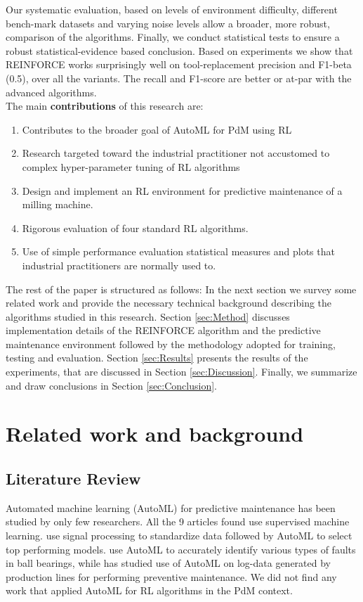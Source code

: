 \documentclass[a4paper, 12pt]{article}
\begin{document}
Our systematic evaluation, based on levels of environment difficulty, different bench-mark datasets and varying noise levels allow a broader, more robust, comparison of the algorithms. Finally, we conduct statistical tests to ensure a robust statistical-evidence based conclusion. Based on experiments we show that REINFORCE works surprisingly well on tool-replacement precision and F1-beta (0.5), over all the variants. The recall and F1-score are better or at-par with the advanced algorithms.\\

The main \textbf{contributions} of this research are:
\begin{enumerate}
	\item Contributes to the broader goal of AutoML for PdM using RL
	\item Research targeted toward the industrial practitioner not accustomed to complex hyper-parameter tuning of RL algorithms
	\item Design and implement an RL environment for predictive maintenance of a milling machine.
	\item Rigorous evaluation of four standard RL algorithms.
	\item Use of simple performance evaluation statistical measures and plots that industrial practitioners are normally used to.
\end{enumerate} 

The rest of the paper is structured as follows: In the next section we survey some related work and provide the necessary technical background describing the algorithms studied in this research. Section \ref{sec:Method} discusses implementation details of the REINFORCE algorithm and the predictive maintenance environment followed by the methodology adopted for training, testing and evaluation. Section \ref{sec:Results} presents the results of the experiments, that are discussed in Section \ref{sec:Discussion}. Finally, we summarize and draw conclusions in Section \ref{sec:Conclusion}.

\section{Related work and background}\label{sec:SLR}
\subsection{Literature Review}
Automated machine learning (AutoML) for predictive maintenance has been studied by only few researchers. All the 9 articles found use supervised machine learning. \cite{AutoML-Larocque} use signal processing to standardize data followed by AutoML to select top performing models. \cite{AutoML-Hadi} use AutoML to accurately identify various types of faults in ball bearings, while \cite{AutoML-Maurer} has studied use of AutoML on log-data generated by production lines for performing preventive maintenance. We did not find any work that applied AutoML for RL algorithms in the PdM context. 
\end{document}
